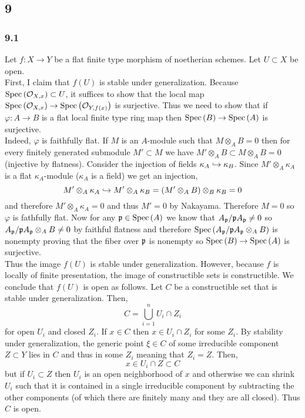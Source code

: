 \documentclass[12pt]{article}
\begin{document}
\subsection{9}

\subsubsection{9.1}

Let $f : X \to Y$ be a flat finite type morphism of noetherian schemes. Let $U \subset X$ be open.
\bigskip\\
First, I claim that $f(U)$ is stable under generalization. Because $\mathrm{Spec}\left( \mathcal{O}_{X, x} \right) \subset U$, it suffices to show that the local map $\mathrm{Spec}\left( \mathcal{O}_{X, x} \right) \to \mathrm{Spec}\left( \mathcal{O}_{Y, f(x)} \right)$ is surjective. Thus we need to show that if $\varphi : A \to B$ is a flat local finite type ring map then $\mathrm{Spec}\left( B \right) \to \mathrm{Spec}\left( A \right)$ is surjective.
\bigskip\\
Indeed, $\varphi$ is faithfully flat. If $M$ is an $A$-module such that $M \otimes_A B = 0$ then for every finitely generated submodule $M' \subset M$ we have $M' \otimes_A B \subset M \otimes_A B = 0$ (injective by flatness). Consider the injection of fields $\kappa_A \hookrightarrow \kappa_B$. Since $M ' \otimes_A \kappa_A$ is a flat $\kappa_A$-module ($\kappa_A$ is a field) we get an injection,
\[ M' \otimes_A \kappa_A \hookrightarrow M' \otimes_A \kappa_B = (M' \otimes_A B) \otimes_B \kappa_B = 0 \]
and therefore $M' \otimes_A \kappa_A = 0$ and thus $M' = 0$ by Nakayama. Therefore $M = 0$ so $\varphi$ is fathfully flat. Now for any $\mathfrak{p} \in \mathrm{Spec}\left( A \right)$ we know that $A_{\mathfrak{p}} / \mathfrak{p} A_{\mathfrak{p}} \neq 0$ so $A_{\mathfrak{p}} / \mathfrak{p} A_{\mathfrak{p}} \otimes_A B \neq 0$ by faithful flatness and therefore $\mathrm{Spec}\left( A_{\mathfrak{p}} / \mathfrak{p} A_{\mathfrak{p}} \otimes_A B \right)$ is nonempty proving that the fiber over $\mathfrak{p}$ is nonempty so $\mathrm{Spec}\left( B \right) \to \mathrm{Spec}\left( A \right)$ is surjective.
\bigskip\\
Thus the image $f(U)$ is stable under generalization. However, because $f$ is locally of finite presentation, the image of constructible sets is constructible. We conclude that $f(U)$ is open as follows. Let $C$ be a constructible set that is stable under generalization. Then,
\[ C = \bigcup_{i = 1}^n U_i \cap Z_i \] 
for open $U_i$ and closed $Z_i$. If $x \in C$ then $x \in U_i \cap Z_i$ for some $Z_i$. By stability under generalization, the generic point $\xi \in C$ of some irreducible component $Z \subset Y$ lies in $C$ and thus in some $Z_i$ meaning that $Z_i = Z$. Then,
\[ x \in U_i \cap Z \subset C \]
but if $U_i \subset Z$ then $U_i$ is an open neighborhood of $x$ and otherwise we can shrink $U_i$ such that it is contained in a single irreducible component by subtracting the other components (of which there are finitely many and they are all closed). Thus $C$ is open.
\end{document}
